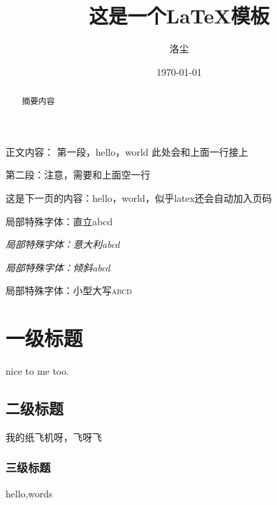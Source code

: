 \documentclass[12pt,a4paper,oneside]{ctexart}
\title{这是一个\LaTeX 模板}
\author{洛尘}
\date{\today}
\begin{document}
    

\maketitle

\tableofcontents

\begin{abstract}
    摘要内容
\end{abstract}

正文内容：
第一段，hello，world
此处会和上面一行接上

第二段：注意，需要和上面空一行

\newpage
这是下一页的内容：hello，world，似乎latex还会自动加入页码

\textup{局部特殊字体：直立abcd}

\textit{局部特殊字体：意大利abcd}

\textsl{局部特殊字体：倾斜abcd}

\textsc{局部特殊字体：小型大写abcd}

\section{一级标题}
nice to me too.
\subsection{二级标题}
我的纸飞机呀，飞呀飞
\subsubsection{三级标题}
hello,words
\end{document}
